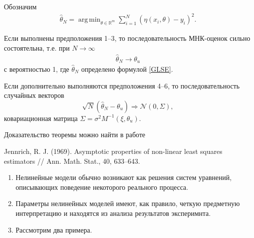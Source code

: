 \documentclass[10pt,slidestop,usepdftitle=false]{beamer}
\DeclareMathOperator*{\argmin}{arg\,min}
\begin{document}
\begin{frame}
Обозначим
\begin{gather}
\label{GLSE}
    \widehat\theta_N = \argmin_{\theta \in \mathbb{R}^m} \sum_{i = 1}^N (\eta(x_i, \theta) - y_i)^2.
\end{gather}
\begin{mytheorem}
    Если выполнены предположения 1--3, то последовательность МНК-оценок сильно состоятельна,
    т.е. при $N \to \infty$
    \begin{gather*}
        \widehat \theta_N \to \theta_u
    \end{gather*}
    с вероятностью 1, где $\widehat \theta_N$ определено формулой \eqref{GLSE}.

    Если дополнительно выполняются предположения 4--6, то последовательность случайных векторов 
    $$\sqrt N (\widehat \theta_N - \theta_u) \Rightarrow \mathcal{N}(\mathrm{0}, \Sigma),$$
     ковариационная матрица $\Sigma = \sigma^2 M^{-1}(\xi, \theta_u)$.
\end{mytheorem}
\end{frame}
\begin{frame}
\bigskip
Доказательство теоремы можно найти в работе

\bigskip

Jennrich, R. J. (1969). Asymptotic properties of non-linear least squares
estimators // Ann. Math. Stat., 40, 633–643.
\pause
\begin{enumerate}
\bigskip

    \item
Нелинейные модели обычно возникают как решения систем уравнений, описывающих поведение некоторого реального процесса. 
\bigskip
\pause
 \item
Параметры нелинейных моделей имеют, как правило, четкую предметную интерпретацию и находятся из анализа результатов эксперимнта.
\pause
\bigskip
 \item


Рассмотрим два примера.

 \end{enumerate}
\end{frame}
\end{document}
